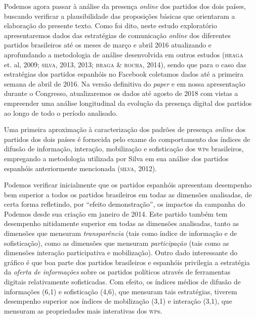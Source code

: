 Podemos agora passar à análise da presença \textit{online} dos partidos dos dois
países, buscando verificar a plausibilidade das proposições básicas que
orientaram a elaboração do presente texto. Como foi dito, neste estudo
exploratório apresentaremos dados das estratégias de comunicação \textit{online}
dos diferentes partidos brasileiros até os meses de março e abril 2016
atualizando e aprofundando a metodologia de análise desenvolvida em
outros estudos (\textsc{braga} et. al, 2009; \textsc{silva}, 2013, 2013; \textsc{braga \& rocha},
2014), sendo que para o caso das estratégias dos partidos espanhóis no
Facebook coletamos dados até a primeira semana de abril de 2016. Na
versão definitiva do \textit{paper} e em nossa apresentação durante o Congresso,
atualizaremos os dados até agosto de 2018 com vistas a empreender uma
análise longitudinal da evolução da presença digital dos partidos ao
longo de todo o período analisado.

Uma primeira aproximação à caracterização dos padrões de presença \textit{online}
dos partidos dos dois países é fornecida pelo exame do
comportamento dos índices de difusão de
informação, interação, mobilização e sofisticação dos \textsc{wp}s brasileiros,
empregando a metodologia utilizada por Silva em sua análise dos partidos
espanhóis anteriormente mencionada (\textsc{silva}, 2012).

Podemos verificar inicialmente que os partidos espanhóis apresentam
desempenho bem superior a todos os partidos brasileiros em todas as
dimensões analisadas, de certa forma refletindo, por ``efeito
demonstração'', os impactos da campanha do Podemos desde sua
criação em janeiro de 2014. Este partido também tem desempenho
nitidamente superior em todas as dimensões analisadas, tanto as
dimensões que mensuram \textit{transparência} (tais como índice de
informação e de sofisticação), como as dimensões que mensuram
\textit{participação} (tais como as dimensões interação participativa e
mobilização). Outro dado interessante do gráfico é que boa parte dos
partidos brasileiros e espanhóis privilegia a estratégia da \textit{oferta
de informações} sobre os partidos políticos através de ferramentas
digitais relativamente sofisticadas. Com efeito, os índices médios de
difusão de informações (6,1) e sofisticação (4,6), que mensuram tais
estratégias, tiverem desempenho superior aos índices de mobilização
(3,1) e interação (3,1), que mensuram as propriedades mais interativas
dos \textsc{wp}s.

